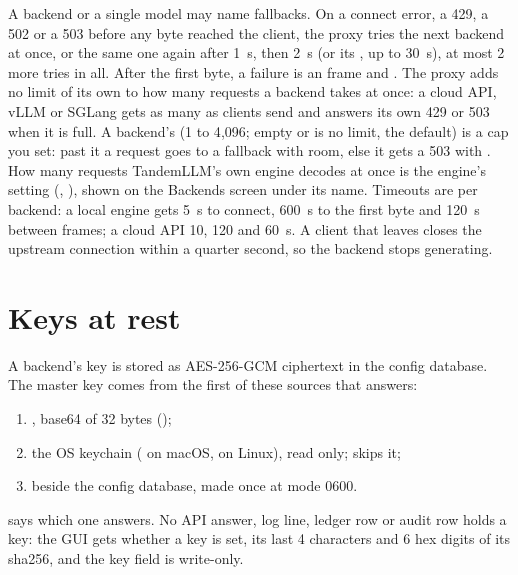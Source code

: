 A backend or a single model may name fallbacks. On a connect error, a 429, a 502 or a 503 before any byte reached the client, the proxy tries the next backend at once, or the same one again after 1~s, then 2~s (or its , up to 30~s), at most 2 more tries in all. After the first byte, a failure is an  frame and \code{[DONE]}. The proxy adds no limit of its own to how many requests a backend takes at once: a cloud API, vLLM or SGLang gets as many as clients send and answers its own 429 or 503 when it is full. A backend's  (1 to 4{,}096; empty or  is no limit, the default) is a cap you set: past it a request goes to a fallback with room, else it gets a 503 with . How many requests TandemLLM's own engine decodes at once is the engine's setting (, ), shown on the Backends screen under its name. Timeouts are per backend: a local engine gets 5~s to connect, 600~s to the first byte and 120~s between frames; a cloud API 10, 120 and 60~s. A client that leaves closes the upstream connection within a quarter second, so the backend stops generating.

\section{Keys at rest}

A backend's key is stored as AES-256-GCM ciphertext in the config database. The master key comes from the first of these sources that answers:

\begin{enumerate}
\item {}, base64 of 32 bytes ();
\item the OS keychain ( on macOS,  on Linux), read only;  skips it;
\item {} beside the config database, made once at mode 0600.
\end{enumerate}

 says which one answers. No API answer, log line, ledger row or audit row holds a key: the GUI gets whether a key is set, its last 4 characters and 6 hex digits of its sha256, and the key field is write-only.


